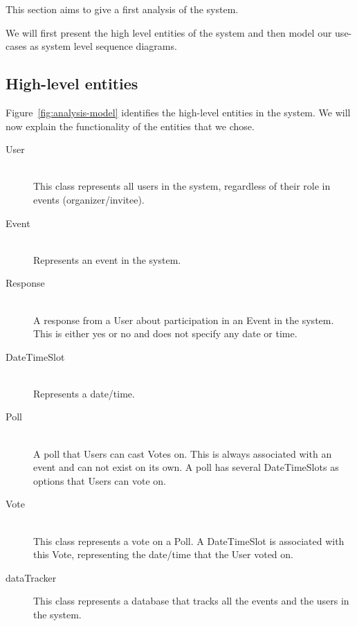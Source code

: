 This section aims to give a first analysis of the system.

We will first present the high level entities of the system and then model our use-cases as system level sequence diagrams.

\subsection{High-level entities}
	\label{sec:analysisdiagram}
	Figure~\ref{fig:analysis-model} identifies the high-level entities in the system. We will now explain the functionality of the entities that we chose.

	\begin{description}
		\item[User] \hfill \\
			This class represents all users in the system, regardless of their role in events (organizer/invitee).
		\item[Event] \hfill \\
			Represents an event in the system.
		\item[Response] \hfill \\
			A response from a User about participation in an Event in the system. This is either yes or no and does not specify any date or time.
		\item[DateTimeSlot] \hfill \\
			Represents a date/time.
		\item[Poll] \hfill \\
			A poll that Users can cast Votes on. This is always associated with an event and can not exist on its own. A poll has several DateTimeSlots as options that Users can vote on.
		\item[Vote] \hfill \\
			This class represents a vote on a Poll. A DateTimeSlot is associated with this Vote, representing the date/time that the User voted on.
		\item[dataTracker]
			This class represents a database that tracks all the events and the users in the system.
			
	\end{description}
	
